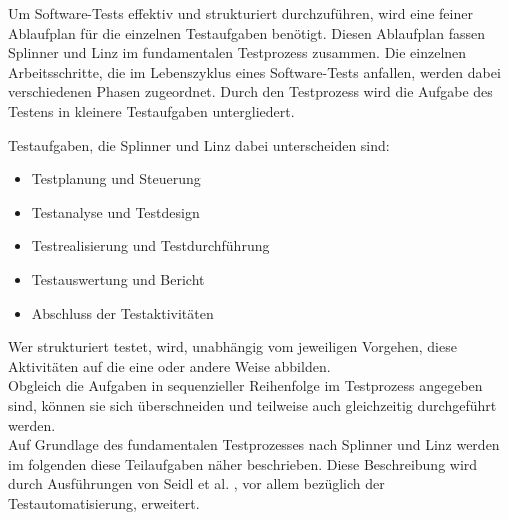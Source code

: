 Um Software-Tests effektiv und strukturiert durchzuführen, wird eine feiner Ablaufplan für die einzelnen Testaufgaben benötigt. Diesen Ablaufplan fassen Splinner und Linz \cite{spillner_basiswissen_2007} im fundamentalen Testprozess zusammen. Die einzelnen Arbeitsschritte, die im Lebenszyklus eines Software-Tests anfallen, werden dabei verschiedenen Phasen zugeordnet.
Durch den Testprozess wird die Aufgabe des Testens in kleinere Testaufgaben untergliedert.

Testaufgaben, die Splinner und Linz \cite{spillner_basiswissen_2007} dabei unterscheiden sind:

\begin{itemize}
	  \itemsep0pt
      \item Testplanung und Steuerung
      \item Testanalyse und Testdesign
      \item Testrealisierung und Testdurchführung
      \item Testauswertung und Bericht
      \item Abschluss der Testaktivitäten       
\end{itemize}

\glqq Wer strukturiert testet, wird, unabhängig vom jeweiligen Vorgehen, diese Aktivitäten auf die eine oder andere Weise abbilden.\grqq\ \cite[S. 9]{seidl_basiswissen_2012} \\
\glqq Obgleich die Aufgaben in sequenzieller Reihenfolge im Testprozess angegeben sind, können sie sich überschneiden und teilweise auch gleichzeitig durchgeführt werden.\grqq\ \cite[S.19]{spillner_basiswissen_2007} \\ Auf Grundlage des fundamentalen Testprozesses nach Splinner und Linz \cite[S.20ff]{spillner_basiswissen_2007} werden im folgenden diese Teilaufgaben näher beschrieben. 
Diese Beschreibung wird durch Ausführungen von Seidl et al. \cite[S. 9 ff.]{seidl_basiswissen_2012}, vor allem bezüglich der Testautomatisierung, erweitert. 

